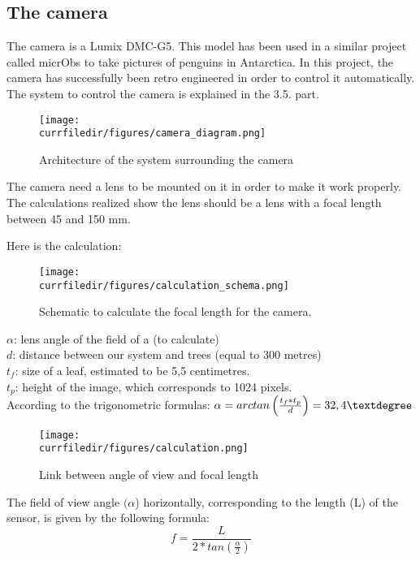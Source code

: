 \newpage
\subsection{The camera}
The camera is a Lumix DMC-G5. This model has been used in a similar project called micrObs to take pictures of penguins in Antarctica. In this project, the camera has successfully been retro engineered in order to control it automatically. The system to control the camera is explained in the 3.5. part.

\begin{figure}[!h]
    \centering
    \texttt{[image: \\currfiledir/figures/camera\_diagram.png]}
    \caption{Architecture of the system surrounding the camera}
\end{figure}

The camera need a lens to be mounted on it in order to make it work properly. The calculations realized show the lens should be a lens with a focal length between 45 and 150 mm.

Here is the calculation:

\begin{figure}[!h]
    \centering
    \texttt{[image: \\currfiledir/figures/calculation\_schema.png]}
    \caption{Schematic to calculate the focal length for the camera.}
\end{figure}

\noindent\(\alpha\): lens angle of the field of a (to calculate)\\
\(d\): distance between our system and trees (equal to 300 metres)\\
\(t_f\): size of a leaf, estimated to be 5,5 centimetres.\\
\(t_p\): height of the image, which corresponds to 1024 pixels.\\

\noindent According to the trigonometric formulas: \(\alpha=arctan\left(\frac{t_f*t_p}{d}\right)=32,4\textdegree\)

\newpage
\begin{figure}[!h]
    \centering
    \texttt{[image: \\currfiledir/figures/calculation.png]}
    \caption{Link between angle of view and focal length}
    \cite{focal_length}
\end{figure}

The field of view angle \((\alpha\)) horizontally, corresponding to the length (L) of the sensor, is given by the following formula:
\begin{equation}
    f=\frac{L}{2*tan\left(\frac{\alpha}{2}\right)}
\end{equation}

